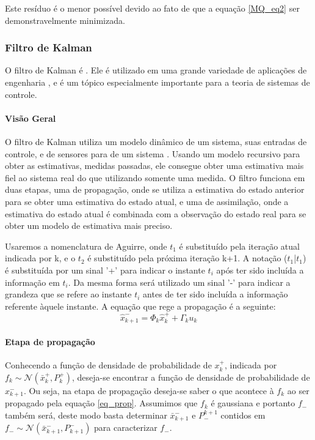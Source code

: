 Este resíduo é o menor possível devido ao fato de que a equação \ref{MQ_eq2} ser demonstravelmente minimizada.

\subsubsection {Filtro de Kalman}
O filtro de Kalman é . Ele é utilizado em uma grande variedade de aplicações de engenharia , e é um tópico especialmente importante para a teoria de sistemas de controle. 
\paragraph{Visão Geral}
O filtro de Kalman utiliza um modelo dinâmico de um sistema, suas entradas de controle, e  de sensores para  de um sistema . Usando um modelo recursivo para obter as estimativas, medidas passadas, ele consegue obter uma estimativa mais fiel ao sistema real do que utilizando somente uma medida. O filtro funciona em duas etapas, uma de propagação, onde se utiliza a estimativa do estado anterior para se obter uma estimativa do estado atual, e uma de assimilação, onde a estimativa do estado atual é combinada com a observação do estado real para se obter um modelo de estimativa mais preciso. 


Usaremos a nomenclatura de Aguirre, onde $t_1$ é substituído pela iteração atual indicada por k, e o $t_2$ é substituído pela próxima iteração k+1. A notação ($t_1$|$t_1$) é substituída por um sinal '+' para indicar o instante $t_i$ após ter sido incluída a informação em $t_i$. Da mesma forma será utilizado um sinal '-' para indicar a grandeza que se refere ao instante $t_i$ antes de ter sido incluída a informação referente àquele instante. A equação que rege a propagação é a seguinte:
\begin{equation} \label{eq_prop}
\hat{x}^{-}_{k+1}=\Phi_k \hat{x}^+_k+\Gamma_ku_k
\end{equation}

\paragraph{Etapa de propagação}
Conhecendo a função de densidade de probabilidade de $x_k^+$, indicada por $f_k\sim \mathcal{N}(\bar{x}^+_k, P^+_k)$, deseja-se encontrar a função de densidade de probabilidade de $x^-_{k+1}$. Ou seja, na etapa de propagação deseja-se saber o que acontece à $f_k$ ao ser propagado pela equação \ref{eq_prop}. Assumimos que $f_k$ é gaussiana e portanto $f_-$ também será, deste modo basta determinar $\bar{x}^-_{k+1}$ e $P_-^{k+1}$ contidos em $f_- \sim \mathcal{N}(\bar{x}^-_{k+1},P^-_{k+1})$ para caracterizar $f_-$.



